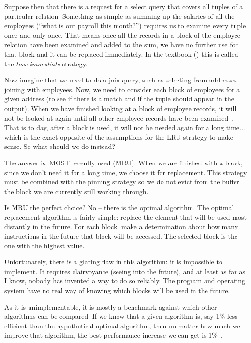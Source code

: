 Suppose then that there is a request for a select query that covers all tuples of a particular relation. Something as simple as summing up the salaries of all the employees (``what is our payroll this month?'') requires us to examine every tuple once and only once. That means once all the records in a block of the employee relation have been examined and added to the sum, we have no further use for that block and it can be replaced immediately. In the textbook (\cite{dsc}) this is called the \textit{toss immediate} strategy.

Now imagine that we need to do a join query, such as selecting from addresses joining with employees. Now, we need to consider each block of employees for a given address (to see if there is a match and if the tuple should appear in the output). When we have finished looking at a block of employee records, it will not be looked at again until all other employee records have been examined~\cite{dsc}. That is to day, after a block is used, it will not be needed again for a long time... which is the exact opposite of the assumptions for the LRU strategy to make sense. So what should we do instead?

The answer is: MOST recently used (MRU). When we are finished with a block, since we don't need it for a long time, we choose it for replacement. This strategy must be combined with the pinning strategy so we do not evict from the buffer the block we are currently still working through.

Is MRU the perfect choice? No -- there is the optimal algorithm. The optimal replacement algorithm is fairly simple: replace the element that will be used most distantly in the future. For each block, make a determination about how many instructions in the future that block will be accessed. The selected block is the one with the highest value.

Unfortunately, there is a glaring flaw in this algorithm: it is impossible to implement. It requires clairvoyance (seeing into the future), and at least as far as I know, nobody has invented a way to do so reliably. The program and operating system have no real way of knowing which blocks will be used in the future.

As it is unimplementable, it is mostly a benchmark against which other algorithms can be compared. If we know that a given algorithm is, say 1\% less efficient than the hypothetical optimal algorithm, then no matter how much we improve that algorithm, the best performance increase we can get is 1\%~\cite{mos}.

